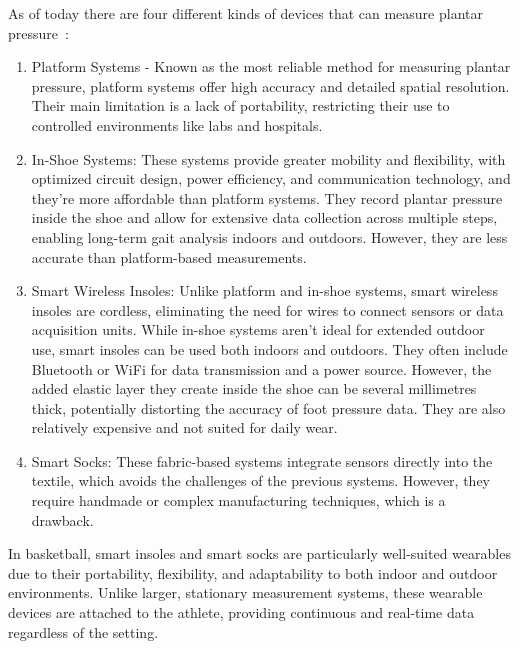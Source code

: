 As of today there are four different kinds of devices that can measure plantar pressure~\cite{smartSocks}:

\begin{enumerate}
  \item Platform Systems - Known as the most reliable method for measuring plantar pressure, platform systems offer high accuracy and detailed spatial resolution. Their main limitation is a lack of portability, restricting their use to controlled environments like labs and hospitals.
  \item In-Shoe Systems: These systems provide greater mobility and flexibility, with optimized circuit design, power efficiency, and communication technology, and they're more affordable than platform systems. They record plantar pressure inside the shoe and allow for extensive data collection across multiple steps, enabling long-term gait analysis indoors and outdoors. However, they are less accurate than platform-based measurements.
  \item Smart Wireless Insoles: Unlike platform and in-shoe systems, smart wireless insoles are cordless, eliminating the need for wires to connect sensors or data acquisition units. While in-shoe systems aren't ideal for extended outdoor use, smart insoles can be used both indoors and outdoors. They often include Bluetooth or WiFi for data transmission and a power source. However, the added elastic layer they create inside the shoe can be several millimetres thick, potentially distorting the accuracy of foot pressure data. They are also relatively expensive and not suited for daily wear.
  \item Smart Socks: These fabric-based systems integrate sensors directly into the textile, which avoids the challenges of the previous systems. However, they require handmade or complex manufacturing techniques, which is a drawback.
\end{enumerate}

In basketball, smart insoles and smart socks are particularly well-suited wearables due to their portability, flexibility, and adaptability to both indoor and outdoor environments. 
Unlike larger, stationary measurement systems, these wearable devices are attached to the athlete, providing continuous and real-time data regardless of the setting.

